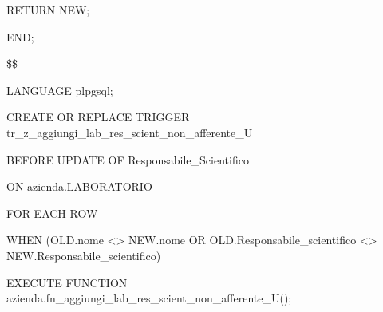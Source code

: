 \begin{flushleft}
\begin{description}
\begin{description}
                        \item RETURN NEW;
                    \end{description}
                    \item END;
                    \item \$\$
                    \item LANGUAGE plpgsql;
                \end{description}
            \end{flushleft}
        \normalfont

        \ttfamily
            \begin{flushleft}
                \begin{description}
                    \item CREATE OR REPLACE TRIGGER tr\_z\_aggiungi\_lab\_res\_scient\_non\_afferente\_U
                    \item BEFORE UPDATE OF Responsabile\_Scientifico
                    \item ON azienda.LABORATORIO
                    \item FOR EACH ROW
                    \item WHEN (OLD.nome <> NEW.nome OR OLD.Responsabile\_scientifico <> NEW.Responsabile\_scientifico)
                    \item EXECUTE FUNCTION azienda.fn\_aggiungi\_lab\_res\_scient\_non\_afferente\_U();
                \end{description}
            \end{flushleft}
        \normalfont

\newpage

